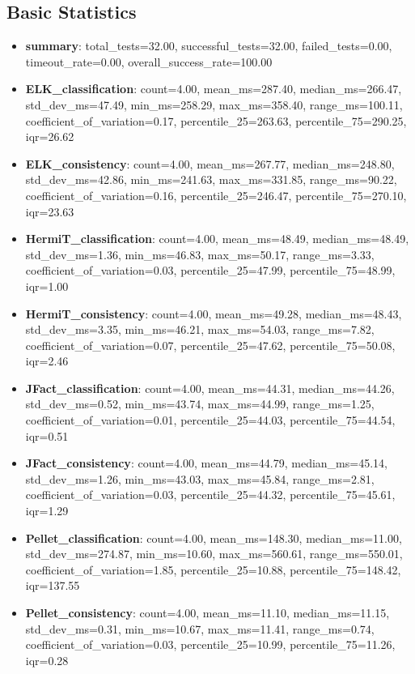 \documentclass[11pt,a4paper]{{article}}
\begin{document}
\subsection{Basic Statistics}
\begin{itemize}
    \item \textbf{summary}: total_tests=32.00, successful_tests=32.00, failed_tests=0.00, timeout_rate=0.00, overall_success_rate=100.00
    \item \textbf{ELK_classification}: count=4.00, mean_ms=287.40, median_ms=266.47, std_dev_ms=47.49, min_ms=258.29, max_ms=358.40, range_ms=100.11, coefficient_of_variation=0.17, percentile_25=263.63, percentile_75=290.25, iqr=26.62
    \item \textbf{ELK_consistency}: count=4.00, mean_ms=267.77, median_ms=248.80, std_dev_ms=42.86, min_ms=241.63, max_ms=331.85, range_ms=90.22, coefficient_of_variation=0.16, percentile_25=246.47, percentile_75=270.10, iqr=23.63
    \item \textbf{HermiT_classification}: count=4.00, mean_ms=48.49, median_ms=48.49, std_dev_ms=1.36, min_ms=46.83, max_ms=50.17, range_ms=3.33, coefficient_of_variation=0.03, percentile_25=47.99, percentile_75=48.99, iqr=1.00
    \item \textbf{HermiT_consistency}: count=4.00, mean_ms=49.28, median_ms=48.43, std_dev_ms=3.35, min_ms=46.21, max_ms=54.03, range_ms=7.82, coefficient_of_variation=0.07, percentile_25=47.62, percentile_75=50.08, iqr=2.46
    \item \textbf{JFact_classification}: count=4.00, mean_ms=44.31, median_ms=44.26, std_dev_ms=0.52, min_ms=43.74, max_ms=44.99, range_ms=1.25, coefficient_of_variation=0.01, percentile_25=44.03, percentile_75=44.54, iqr=0.51
    \item \textbf{JFact_consistency}: count=4.00, mean_ms=44.79, median_ms=45.14, std_dev_ms=1.26, min_ms=43.03, max_ms=45.84, range_ms=2.81, coefficient_of_variation=0.03, percentile_25=44.32, percentile_75=45.61, iqr=1.29
    \item \textbf{Pellet_classification}: count=4.00, mean_ms=148.30, median_ms=11.00, std_dev_ms=274.87, min_ms=10.60, max_ms=560.61, range_ms=550.01, coefficient_of_variation=1.85, percentile_25=10.88, percentile_75=148.42, iqr=137.55
    \item \textbf{Pellet_consistency}: count=4.00, mean_ms=11.10, median_ms=11.15, std_dev_ms=0.31, min_ms=10.67, max_ms=11.41, range_ms=0.74, coefficient_of_variation=0.03, percentile_25=10.99, percentile_75=11.26, iqr=0.28
\end{itemize}
\end{document}
